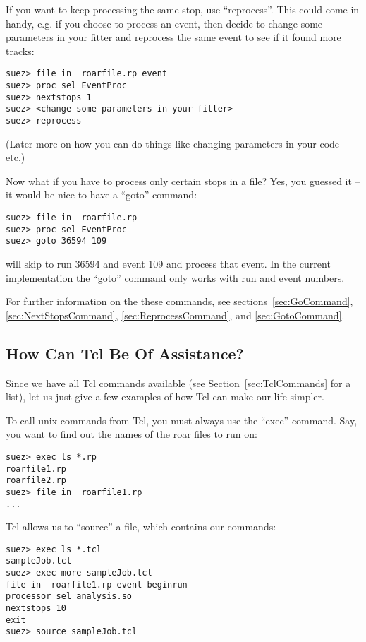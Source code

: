 \documentclass[12pt]{article}
\begin{document}
If you want to keep processing the same stop, use ``reprocess''. This
could come in handy, e.g. if you choose to process an event, then decide
to change some parameters in your fitter and reprocess the same event to
see if it found more tracks:
%
\begin{verbatim}
suez> file in  roarfile.rp event
suez> proc sel EventProc
suez> nextstops 1
suez> <change some parameters in your fitter>
suez> reprocess
\end{verbatim}
%
(Later more on how you can do things like changing parameters in your
code etc.)

Now what if you have to process only certain stops in a file? Yes, you
guessed it -- it would be nice to have a ``goto'' command:
%
\begin{verbatim}
suez> file in  roarfile.rp 
suez> proc sel EventProc
suez> goto 36594 109
\end{verbatim}
%
will skip to run 36594 and event 109 and process that event. In the
current implementation the ``goto'' command only works with run and
event numbers.


For further information on the these commands, see
sections~\ref{sec:GoCommand}, \ref{sec:NextStopsCommand},
\ref{sec:ReprocessCommand}, and \ref{sec:GotoCommand}. 


\subsection{How Can Tcl Be Of Assistance?}
\label{sec:tutorial-Tcl}

Since we have all Tcl commands available (see
Section~\ref{sec:TclCommands} for a list), let us just give a few
examples of how Tcl can make our life simpler.

To call unix commands from Tcl, you must always use the ``exec''
command. Say, you want to find out the names of the roar files to run
on:
\begin{verbatim}
suez> exec ls *.rp
roarfile1.rp
roarfile2.rp
suez> file in  roarfile1.rp
...
\end{verbatim}

Tcl allows us to ``source'' a file, which contains our commands:
%
\begin{verbatim}
suez> exec ls *.tcl
sampleJob.tcl
suez> exec more sampleJob.tcl
file in  roarfile1.rp event beginrun
processor sel analysis.so
nextstops 10
exit
suez> source sampleJob.tcl
\end{verbatim}
\end{document}

